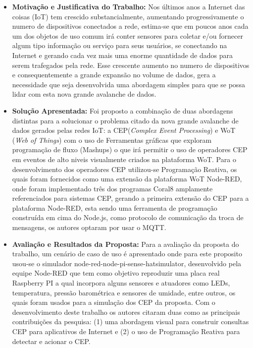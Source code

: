 \documentclass[tid,table]{texufpel} %
\begin{document}
\begin{itemize}
	\item \textbf{Motivação e Justificativa do Trabalho:} Nos últimos anos a Internet das coisas (IoT) tem crescido substancialmente, aumentando progressivamente o numero de dispositivos conectados a rede, estima-se que em poucos anos cada um dos objetos de uso comum irá conter sensores para coletar e/ou fornecer algum tipo informação ou serviço para seus usuários, se conectando na Internet e gerando cada vez mais uma enorme quantidade de dados para serem trafegados pela rede. Esse crescente aumento no numero de dispositivos e consequentemente a grande expansão no volume de dados, gera a necessidade que seja desenvolvida uma abordagem simples para que se possa lidar com esta nova grande avalanche de dados.
	
	\item \textbf{Solução Apresentada:}  Foi proposto a combinação de duas abordagens distintas para a solucionar o problema citado da nova grande avalanche de dados gerados pelas redes IoT: a CEP(\textit{Complex Event Processing}) e WoT (\textit{Web of Things}) com o uso de Ferramentas gráficas que exploram programação de fluxo (Mashups) o que irá permitir o uso de operadores CEP em eventos de alto niveis visualmente criados na plataforma WoT.
	Para o desenvolvimento dos operadores CEP utilizou-se Programação Reativa, os quais foram fornecidos como uma extensão da plataforma WoT Node-RED, onde foram implementado três dos programas Coral8 amplamente referenciados para sistemas CEP, gerando a primeira extensão do CEP para a plataforma Node-RED, esta sendo uma ferramenta de programação construída em cima do Node.js, como protocolo de comunicação da troca de mensagens, os autores optaram por usar o MQTT. 
	
	\item \textbf{Avaliação e Resultados da Proposta:} Para a avaliação da proposta do trabalho, um cenário de caso de uso é apresentado onde para este proposito usou-se o simulador node-red-node-pi-sense-hatsimulator, desenvolvido pela equipe Node-RED que tem como objetivo reproduzir uma placa real Raspberry PI a qual incorpora alguns sensores e atuadores como LEDs, temperatura, pressão barométrica e sensores de umidade, entre outros, os quais foram usados para a simulação dos CEP da proposta. Com o desenvolvimento deste trabalho os autores citaram duas como as principais contribuições da pesquisa: (1) uma abordagem visual para construir consultas CEP para aplicativos de Internet e (2) o uso de Programação Reativa para detectar e acionar o CEP.
	
\end{itemize}
\end{document}
